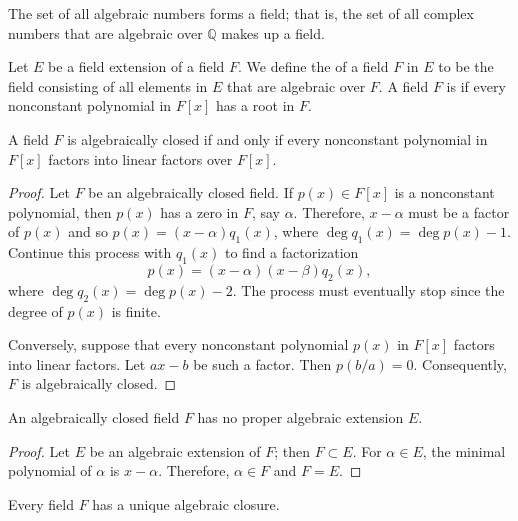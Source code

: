  
\begin{corollary}\label{fields:algebraics_field_corollary}
The set of all algebraic numbers forms a field; that is, the set of all
complex numbers that are algebraic over ${\mathbb Q}$ makes up a field.
\end{corollary}
 

Let $E$ be a field extension of a field $F$. We define the   of a field $F$ in $E$ to
be the field consisting of all elements in $E$ that are algebraic over
$F$. A field $F$ is  if every nonconstant
polynomial in  $F[x]$ has a root in $F$. 

 
\begin{theorem}
A field $F$ is algebraically closed if and only if every nonconstant
polynomial in $F[x]$ factors into linear factors over $F[x]$.
\end{theorem}
 
 
\begin{proof}
Let $F$ be an algebraically closed field. If $p(x) \in F[x]$ is a
nonconstant polynomial, then $p(x)$ has a zero in $F$, say $\alpha$.
Therefore, $x-\alpha$ must be a factor of $p(x)$ and so $p(x) = (x-
\alpha) q_1(x)$, where $\deg q_1(x) = \deg p(x) - 1$. Continue this
process with $q_1(x)$ to find a factorization
\[
p(x)=(x-\alpha)(x-\beta)q_2(x),
\]
where $\deg q_2(x) = \deg p(x) -2$. The process must eventually stop
since the degree of $p(x)$ is finite.  
 

Conversely, suppose that every nonconstant polynomial $p(x)$ in $F[x]$ 
factors into linear factors. Let $ax-b$ be such a factor.
Then $p( b/a) = 0$. Consequently, $F$ is algebraically closed.
\end{proof}
 
 
\begin{corollary}
An algebraically closed field $F$ has no proper algebraic extension
$E$. 
\end{corollary}
 

\begin{proof}
Let $E$ be an algebraic extension of $F$; then $F \subset E$. For $\alpha
\in E$, the minimal polynomial of $\alpha$ is $x - \alpha$. Therefore, 
$\alpha \in F$ and $F=E$. 
\end{proof}


\begin{theorem}
Every field $F$ has a unique algebraic closure.
\end{theorem}


